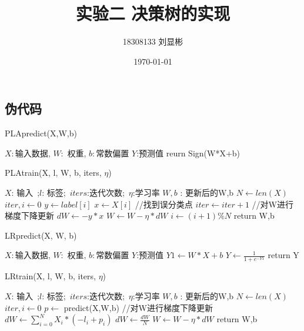 \documentclass[11pt]{article}
\title{实验二 决策树的实现}
\author{18308133 刘显彬}
\date{\today}
\begin{document}
\begin{CJK}{UTF8}{gbsn}
\maketitle
\section{伪代码}
\begin{algorithm}
\caption{PLApredict(X,W,b)}
\label{alg1}
\begin{algorithmic}
\REQUIRE $X:$输入数据, $W:$	权重, $b:$常数偏置
\ENSURE $Y$:预测值
\STATE reurn Sign(W*X+b)

\end{algorithmic}
	
\end{algorithm}

\begin{algorithm}

\caption{PLAtrain(X, l, W, b, iters, $\eta$)}\label{alg2}
\begin{algorithmic}
\REQUIRE $X$: 输入\ ;$l$: 标签;\ $iters$:迭代次数;\ $\eta$:学习率
\ENSURE $W,b$ : 更新后的W,b
\STATE $N \gets len(X)$
\STATE $iter,i \gets 0$
	\STATE $y \gets label[i]$
	\STATE $x \gets X[i]$
	\STATE //找到误分类点
	\STATE $iter \gets iter+1$
	\STATE //对W进行梯度下降更新
	\STATE $dW \gets -y*x$
	\STATE $W \gets W-\eta *dW$
	\ENDIF
	\STATE $i \gets (i+1)\%N$
\ENDWHILE
\STATE return W,b
\end{algorithmic}
\end{algorithm}


\begin{algorithm}
\caption{LRpredict(X, W, b)}\label{alg3}
\begin{algorithmic}
\REQUIRE $X:$输入数据, $W:$	权重, $b:$常数偏置
\ENSURE $Y$:预测值
\STATE $Y1\gets W*X+b$
\STATE $Y\gets \frac{1}{1+e^{-Y1}}$
\STATE return Y
\end{algorithmic}
\end{algorithm}



\begin{algorithm}

\caption{LRtrain(X, l, W, b, iters, $\eta$)}\label{alg4}
\begin{algorithmic}
\REQUIRE $X$: 输入\ ;$l$: 标签;\ $iters$:迭代次数;\ $\eta$:学习率
\ENSURE $W,b$ : 更新后的W,b
\STATE $N \gets len(X)$
\STATE $iter,i \gets 0$
	\STATE $p \gets$ predict(X,W,b)
	\STATE //对W进行梯度下降更新
	\STATE $dW\gets \sum_{i=0}^{N}X_i*(-l_i+p_i)$
	\STATE $dW \gets \frac{dW}{N	}$
	\STATE $W \gets W-\eta *dW$
\ENDFOR
\STATE return W,b
\end{algorithmic}
\end{algorithm}





\end{CJK}
\end{document}
